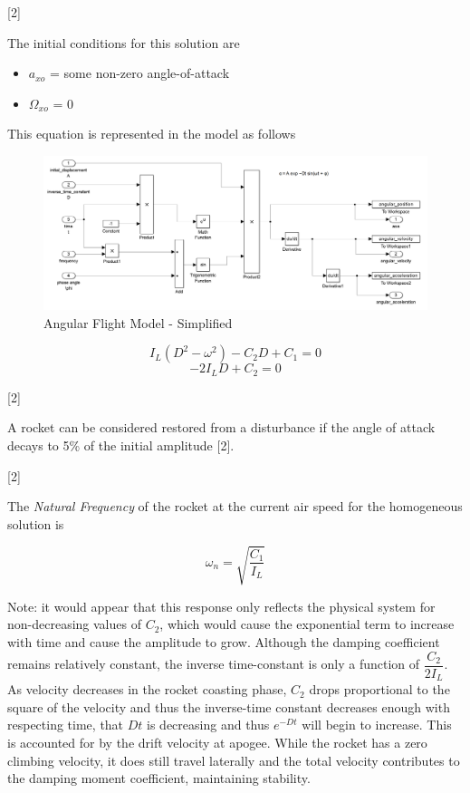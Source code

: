 \documentclass[]{book}
\providecommand{\tightlist}{%
  \setlength{\itemsep}{0pt}\setlength{\parskip}{0pt}}
\begin{document}
{[}2{]}

The initial conditions for this solution are

\begin{itemize}
\tightlist
\item
  \(a_{xo}\) = some non-zero angle-of-attack
\item
  \(\Omega_{xo}\) = 0
\end{itemize}

This equation is represented in the model as follows

\begin{figure}[htbp]
\centering
\includegraphics{images/angular_model_simplified.png}
\caption{Angular Flight Model - Simplified
\label{angular_model_simplified}}
\end{figure}

\[
I_L (D^2 - \omega^2) - C_2 D + C_1 = 0
\] \[
-2 I_L D + C_2 = 0
\]

{[}2{]}

A rocket can be considered restored from a disturbance if the angle of
attack decays to 5\% of the initial amplitude {[}2{]}.

{[}2{]}

The \emph{Natural Frequency} of the rocket at the current air speed for
the homogeneous solution is

\begin{equation}
\label{eq_natural_frequency_homogeneous}
\omega_n = \sqrt{ \dfrac{C_1}{I_L} }
\end{equation}

Note: it would appear that this response only reflects the physical
system for non-decreasing values of \(C_2\), which would cause the
exponential term to increase with time and cause the amplitude to grow.
Although the damping coefficient remains relatively constant, the
inverse time-constant is only a function of \(\dfrac{C_2}{2 I_L}\). As
velocity decreases in the rocket coasting phase, \(C_2\) drops
proportional to the square of the velocity and thus the inverse-time
constant decreases enough with respecting time, that \(Dt\) is
decreasing and thus \(e^{-Dt}\) will begin to increase. This is
accounted for by the drift velocity at apogee. While the rocket has a
zero climbing velocity, it does still travel laterally and the total
velocity contributes to the damping moment coefficient, maintaining
stability.
\end{document}
